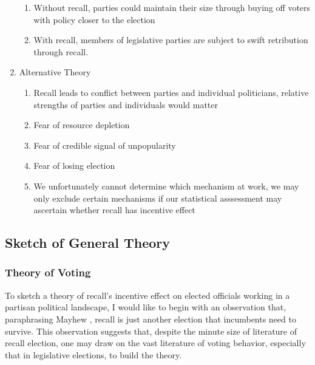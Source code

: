 \documentclass[hyphens, crop=false]{standalone}
\begin{document}
\begin{enumerate}
\begin{enumerate}
			\item 
			Without recall, parties could maintain their size through buying off voters with policy closer to the election
			\item 
			With recall, members of legislative parties are subject to swift retribution through recall.
		\end{enumerate}
		\item 
		Alternative Theory
		\begin{enumerate}
			\item 
			Recall leads to conflict between parties and individual politicians, relative strengths of parties and individuals would matter
			\item 
			Fear of resource depletion
			\item 
			Fear of credible signal of unpopularity
			\item 
			Fear of losing election
			\item 
			We unfortunately cannot determine which mechanism at work, we may only exclude certain mechanisms if our statistical asssessment may ascertain whether recall has incentive effect
		\end{enumerate}
	\end{enumerate}
	
	\subsection*{Sketch of General Theory}
	
		\subsubsection*{Theory of Voting}
		To sketch a theory of recall's incentive effect on elected officials
		working in a partisan political landscape, I would like to begin with an observation that,
		paraphrasing Mayhew
		\autocite*{mayhewCongressElectoralConnection1974},
		recall is just another election that incumbents need to survive.
		This observation suggests that,
		despite the minute size of literature of recall election,
		one may draw on the vast literature of voting behavior,
		especially that in legislative elections,
		to build the theory. 
		
\end{document}

